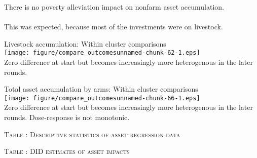 \begin{frame}{}
There is no poverty alleviation impact on nonfarm asset accumulation. \\~\\
\pause
\vspace{2ex}
This was expected, because most of the investments were on livestock.
\end{frame}

\begin{frame}{}
Livestock accumulation: Within cluster comparisons\\
\hfil\texttt{[image: figure/compare\_outcomesunnamed-chunk-62-1.eps]}\\
\pause
Zero difference at start but becomes increasingly more heterogenous in the later rounds.
\end{frame}

\begin{frame}{}
Total asset accumulation by arms: Within cluster comparisons\\
\hfil\texttt{[image: figure/compare\_outcomesunnamed-chunk-66-1.eps]} \\
\pause
Zero difference at start but becomes increasingly more heterogenous in the later rounds. Dose-response is not monotonic.
\end{frame}

\begin{frame}{}
\hfil\textsc{\footnotesize Table \thetable: Descriptive statistics of asset regression data\label{destat.alr.sss}}\\
\setlength{\tabcolsep}{1pt}
\renewcommand{\arraystretch}{.6}
\hfil{}
\end{frame}

\begin{frame}{}
\hfil\textsc{\footnotesize Table \thetable: DID estimates of asset impacts\label{FDasset}}\\
\setlength{\tabcolsep}{1pt}
\renewcommand{\arraystretch}{.6}
\hfil{}\\
\renewcommand{\arraystretch}{1}
\end{frame}

